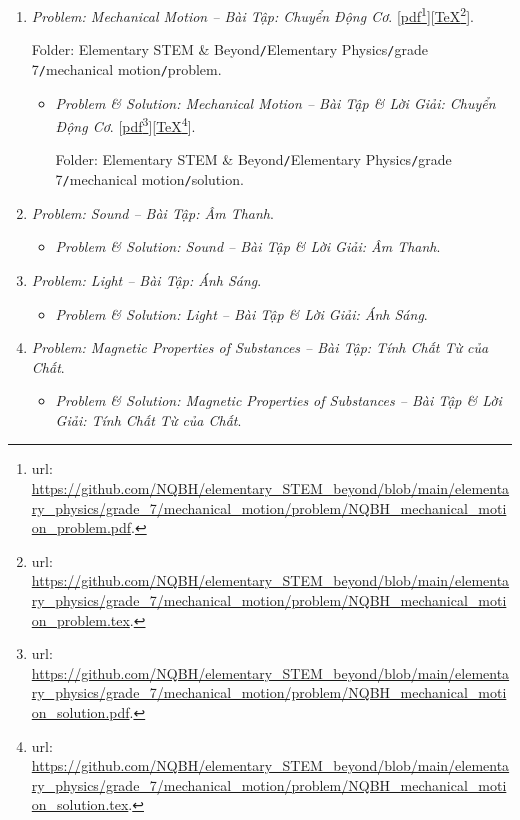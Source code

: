 \documentclass[12pt,oneside]{book}
\begin{document}
\begin{enumerate}
	\item {\it Problem: Mechanical Motion -- Bài Tập: Chuyển Động Cơ}. [\href{https://github.com/NQBH/elementary_STEM_beyond/blob/main/elementary_physics/grade_7/mechanical_motion/problem/NQBH_mechanical_motion_problem.pdf}{pdf}\footnote{{\sc url}: \url{https://github.com/NQBH/elementary_STEM_beyond/blob/main/elementary_physics/grade_7/mechanical_motion/problem/NQBH_mechanical_motion_problem.pdf}.}][\href{https://github.com/NQBH/elementary_STEM_beyond/blob/main/elementary_physics/grade_7/mechanical_motion/problem/NQBH_mechanical_motion_problem.tex}{\TeX}\footnote{{\sc url}: \url{https://github.com/NQBH/elementary_STEM_beyond/blob/main/elementary_physics/grade_7/mechanical_motion/problem/NQBH_mechanical_motion_problem.tex}.}].
	
	Folder: {\sf Elementary STEM \& Beyond{\tt/}Elementary Physics{\tt/}grade 7{\tt/}mechanical motion{\tt/}problem}.	
	\begin{itemize}
		\item {\it Problem \& Solution: Mechanical Motion -- Bài Tập \& Lời Giải: Chuyển Động Cơ}. [\href{https://github.com/NQBH/elementary_STEM_beyond/blob/main/elementary_physics/grade_7/mechanical_motion/problem/NQBH_mechanical_motion_solution.pdf}{pdf}\footnote{{\sc url}: \url{https://github.com/NQBH/elementary_STEM_beyond/blob/main/elementary_physics/grade_7/mechanical_motion/problem/NQBH_mechanical_motion_solution.pdf}.}][\href{https://github.com/NQBH/elementary_STEM_beyond/blob/main/elementary_physics/grade_7/mechanical_motion/problem/NQBH_mechanical_motion_solution.tex}{\TeX}\footnote{{\sc url}: \url{https://github.com/NQBH/elementary_STEM_beyond/blob/main/elementary_physics/grade_7/mechanical_motion/problem/NQBH_mechanical_motion_solution.tex}.}].
		
		Folder: {\sf Elementary STEM \& Beyond{\tt/}Elementary Physics{\tt/}grade 7{\tt/}mechanical motion{\tt/}solution}.
	\end{itemize}
	\item {\it Problem: Sound -- Bài Tập: Âm Thanh}.
	\begin{itemize}
		\item {\it Problem \& Solution: Sound -- Bài Tập \& Lời Giải: Âm Thanh}.
	\end{itemize}
	\item {\it Problem: Light -- Bài Tập: Ánh Sáng}.
	\begin{itemize}
		\item {\it Problem \& Solution: Light -- Bài Tập \& Lời Giải: Ánh Sáng}.
	\end{itemize}
	\item {\it Problem: Magnetic Properties of Substances -- Bài Tập: Tính Chất Từ của Chất}.
	\begin{itemize}
		\item {\it Problem \& Solution: Magnetic Properties of Substances -- Bài Tập \& Lời Giải: Tính Chất Từ của Chất}.
	\end{itemize}
\end{enumerate}
\end{document}
